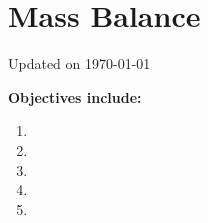 \chapter{Mass Balance}\label{chp:mass_balance}
Updated on \today
\minitoc



\vspace{5mm}

\textbf{Objectives include:}
\begin{enumerate}
    \item
    \item
    \item
    \item
    \item
\end{enumerate}

\section{}



\printbibliography[heading=subbibintoc]